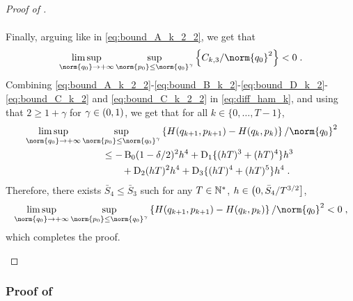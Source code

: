 \begin{proof}[Proof of ]
\begin{enumerate}[label=(\alph*),leftmargin=0cm,itemindent=0.5cm,labelwidth=1.2\itemindent,labelsep=0cm,align=left]
\begin{equation}
\begin{aligned}
\end{aligned}
\end{equation}
Finally, arguing like in \eqref{eq:bound_A_k_2_2}, we get that
\begin{equation}
\label{eq:bound_C_k_2_2}
  \limsup_{\norm{q_0} \to \plusinfty}  \sup_{\norm{p_0} \leq \norm{q_0}^{\gamma}} \defEns{C_{k,3}/\norm{q_0}^{2}} < 0 \eqsp.
\end{equation}
Combining \eqref{eq:bound_A_k_2_2}-\eqref{eq:bound_B_k_2}-\eqref{eq:bound_D_k_2}-\eqref{eq:bound_C_k_2} and \eqref{eq:bound_C_k_2_2} in  \eqref{eq:diff_ham_k}, and using that  $2 \geq 1+ \gamma $ for  $\gamma \in \left(0,1\right)$, we get that for all $k\in \{0, \ldots,T-1\}$,
\begin{align}
  &  \limsup_{\norm{q_0} \to \plusinfty}  \sup_{\norm{p_0} \leq \norm{q_0}^{\gamma}} \defEns{\Ham(q_{k+1},p_{k+1})-\Ham(q_{k},p_{k})}/\norm{q_0}^{2} \\
  & \qquad \qquad\qquad \qquad \leq - \BB_0 (1-\delta/2)^{2} h^4 + \rmD_1\{(hT)^3 + (hT)^4\} h^3 \\
  & \qquad \qquad  \qquad \qquad \qquad + \rmD_2(hT)^2h^4 + \rmD_3\{(hT)^4 + (hT)^5\} h^4\eqsp.
\end{align}
Therefore, there exists $\bar{S}_4\leq \bar{S}_3$ such for any $T\in \mathbb{N}^{*}$, $h \in \left(0,\bar{S}_4/T^{3/2}\right]$,
\begin{equation}
    \limsup_{\norm{q_0} \to \plusinfty}  \sup_{\norm{p_0} \leq \norm{q_0}^{\gamma}} \defEns{\Ham(q_{k+1},p_{k+1})-\Ham(q_{k},p_{k})}/\norm{q_0}^{2}< 0 \eqsp,
  \end{equation}
  which completes the proof.
\end{enumerate}
\end{proof}

\subsubsection{Proof of }
\label{sec:proof-crefth_accept_2}


